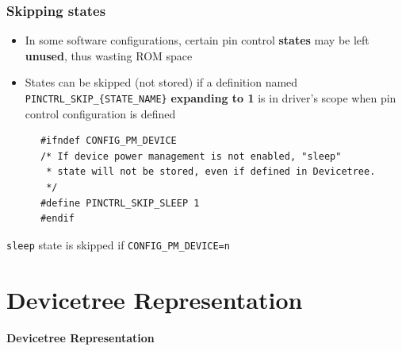 \documentclass[handout]{beamer}
\begin{document}
\begin{frame}[fragile]
  \frametitle{Skipping states}

  \begin{itemize}
    \item<1-> In some software configurations, certain pin control
          \textbf{states} may be left \textbf{unused}, thus wasting ROM space
    \item<2-> States can be skipped (not stored) if a definition named
          \texttt{PINCTRL\_SKIP\_\{STATE\_NAME\}} \textbf{expanding to 1} is
          in driver's scope when pin control configuration is defined
  \end{itemize}

  \begin{listing}[H]
    \begin{verbatim}
      #ifndef CONFIG_PM_DEVICE
      /* If device power management is not enabled, "sleep"
       * state will not be stored, even if defined in Devicetree.
       */
      #define PINCTRL_SKIP_SLEEP 1
      #endif
    \end{verbatim}
    \caption{\texttt{sleep} state is skipped if \texttt{CONFIG\_PM\_DEVICE=n}}
  \end{listing}
\end{frame}


\section{Devicetree Representation}

\begin{frame}
  \begin{center}
    \Huge \textbf{Devicetree Representation}
  \end{center}
\end{frame}
\end{document}
